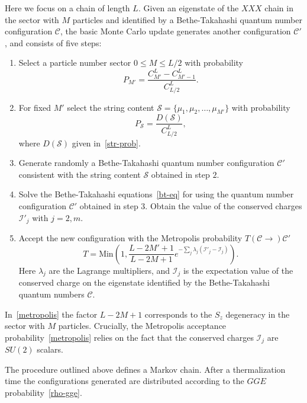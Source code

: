 \documentclass[twocolumn,superscriptaddress,prb,10pt]{revtex4-1}
\begin{document}
Here we focus on a chain of length $L$. Given an eigenstate of the $XXX$ chain 
in the sector with $M$ particles and identified by a Bethe-Takahashi quantum number 
configuration ${\mathcal C}$, the basic Monte Carlo update generates another 
configuration ${\mathcal C}'$, and consists of five steps:
%
\begin{enumerate}
%
\item Select a particle number sector $0\le M\le L/2$ with probability 
%
\begin{equation}
P_{M'}=\frac{C^{L}_{M'}-C^L_{M'-1}}{C^{L}_{L/2}}.
\end{equation}
%
\item For fixed $M'$ select the string content ${\mathcal S}=\{\mu_1,\mu_2,\dots,
\mu_{M'}\}$ with probability
%
\begin{equation}
P_{\mathcal S}=\frac{D({\mathcal S})}{C^L_{L/2}},
\end{equation}
%
where $D({\mathcal S})$ given in~\eqref{str-prob}.
\item Generate randomly a Bethe-Takahashi quantum number configuration ${\mathcal C'}$ 
consistent with the string content ${\mathcal S}$ obtained in step $2$.
\item Solve the Bethe-Takahashi equations~\eqref{bt-eq} for using the quantum number 
configuration ${\mathcal C}'$ obtained in step $3$. Obtain the value of the conserved 
charges ${\mathcal I}'_j$ with $j=2,m$.
\item Accept the new configuration with the Metropolis probability $T({\mathcal C}
\rightarrow){\mathcal C}'$ 
%
\begin{equation}
\label{metropolis}
T=
\textrm{Min}\left(1,\frac{L-2M'+1}{L-2M+1}e^{-\sum_j\lambda_j({\mathcal I}'_j-{\mathcal 
I}^{}_j)}\right).
\end{equation}
Here $\lambda_j$ are the Lagrange multipliers, and ${\mathcal I}_j$ is the expectation 
value of the conserved charge on the eigenstate identified by the Bethe-Takahashi quantum 
numbers ${\mathcal C}$. 
\end{enumerate}
%
In~\eqref{metropolis} the factor $L-2M+1$ corresponds to the $S_z$ degeneracy in the 
sector with $M$ particles. Crucially, the Metropolis acceptance probability~\eqref{metropolis} 
relies on the fact that the conserved charges ${\mathcal I}_j$ are $SU(2)$ scalars. 

The procedure outlined above defines a Markov chain. After a thermalization time the 
configurations generated are distributed according to the $GGE$ probability~\eqref{rho-gge}. 
\end{document}

